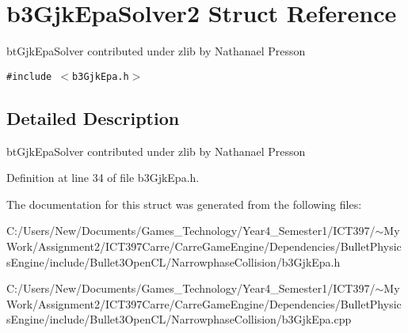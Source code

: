\hypertarget{structb3_gjk_epa_solver2}{
\section{b3GjkEpaSolver2 Struct Reference}
\label{structb3_gjk_epa_solver2}
}
btGjkEpaSolver contributed under zlib by Nathanael Presson  


{\tt \#include $<$b3GjkEpa.h$>$}



\subsection{Detailed Description}
btGjkEpaSolver contributed under zlib by Nathanael Presson 

Definition at line 34 of file b3GjkEpa.h.

The documentation for this struct was generated from the following files:\begin{CompactItemize}
\item 
C:/Users/New/Documents/Games\_\-Technology/Year4\_\-Semester1/ICT397/$\sim$My Work/Assignment2/ICT397Carre/CarreGameEngine/Dependencies/BulletPhysicsEngine/include/Bullet3OpenCL/NarrowphaseCollision/b3GjkEpa.h\item 
C:/Users/New/Documents/Games\_\-Technology/Year4\_\-Semester1/ICT397/$\sim$My Work/Assignment2/ICT397Carre/CarreGameEngine/Dependencies/BulletPhysicsEngine/include/Bullet3OpenCL/NarrowphaseCollision/b3GjkEpa.cpp\end{CompactItemize}
